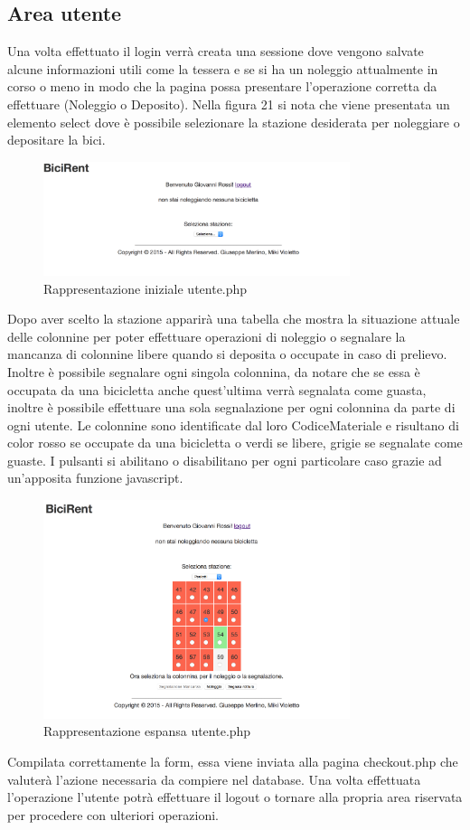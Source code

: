 \documentclass[a4paper,twoside]{article}
\begin{document}
\subsection{Area utente}
Una volta effettuato il login verrà creata una sessione dove vengono salvate alcune informazioni utili come la tessera e se si ha un noleggio attualmente in corso o meno in modo che la pagina possa presentare l'operazione corretta da effettuare (Noleggio o Deposito). Nella figura 21 si nota che viene presentata un elemento select dove è possibile selezionare la stazione desiderata per noleggiare o depositare la bici.
\begin{figure}[H]
	\centering
	\includegraphics[width=0.8\textwidth]{Screenshot02}
	\caption{Rappresentazione iniziale utente.php}
\end{figure}
Dopo aver scelto la stazione apparirà una tabella che mostra la situazione attuale delle colonnine per poter effettuare operazioni di noleggio o segnalare la mancanza di colonnine libere quando si deposita o occupate in caso di prelievo. Inoltre è possibile segnalare ogni singola colonnina, da notare che se essa è occupata da una bicicletta anche quest'ultima verrà segnalata come guasta, inoltre è possibile effettuare una sola segnalazione per ogni colonnina da parte di ogni utente.
Le colonnine sono identificate dal loro CodiceMateriale e risultano di color rosso se occupate da una bicicletta o verdi se libere, grigie se segnalate come guaste.
I pulsanti si abilitano o disabilitano per ogni particolare caso grazie ad un'apposita funzione javascript. 
\begin{figure}[H]
	\centering
	\includegraphics[width=0.8\textwidth]{Screenshot03}
	\caption{Rappresentazione espansa utente.php}
\end{figure}
Compilata correttamente la form, essa viene inviata alla pagina checkout.php che valuterà l'azione necessaria da compiere nel database.
Una volta effettuata l'operazione l'utente potrà effettuare il logout o tornare alla propria area riservata per procedere con ulteriori operazioni.
\end{document}
